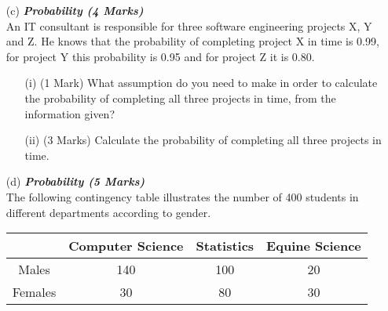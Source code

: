 \documentclass[]{article}
\begin{document}
\begin{itemize}
\item[(c)] \textbf{\textit{Probability (4 Marks)}}\\ An IT consultant is responsible for three software engineering projects X, Y and Z.
He knows that the probability of completing project X in time is 0.99, for project Y this probability is 0.95
and for project Z it is 0.80.

\begin{itemize}
\item[(i)] (1 Mark) What assumption do you need to make in order to calculate the probability
of completing all three projects in time, from the information given?
\item[(ii)] (3 Marks) Calculate the probability of completing all three projects in time.
\end{itemize}
\newpage
\item[(d)] \textbf{\textit{Probability (5 Marks)}}\\ The following contingency table illustrates the number of 400 students in different
departments according to gender.

\begin{center}
\begin{tabular}{|c|c|c|c|}
  \hline
   & Computer Science & Statistics & Equine Science \\\hline
  Males & 140 & 100 & 20  \\  \hline
  Females & 30 & 80 & 30  \\ \hline

  \hline
\end{tabular}
\end{center}


\end{itemize}
\end{document}

